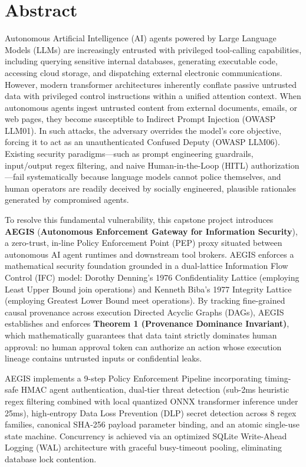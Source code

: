 \chapter*{Abstract}

Autonomous Artificial Intelligence (AI) agents powered by Large Language Models (LLMs) are increasingly entrusted with privileged tool-calling capabilities, including querying sensitive internal databases, generating executable code, accessing cloud storage, and dispatching external electronic communications. However, modern transformer architectures inherently conflate passive untrusted data with privileged control instructions within a unified attention context. When autonomous agents ingest untrusted content from external documents, emails, or web pages, they become susceptible to Indirect Prompt Injection (OWASP LLM01). In such attacks, the adversary overrides the model's core objective, forcing it to act as an unauthenticated Confused Deputy (OWASP LLM06). Existing security paradigms—such as prompt engineering guardrails, input/output regex filtering, and naive Human-in-the-Loop (HITL) authorization—fail systematically because language models cannot police themselves, and human operators are readily deceived by socially engineered, plausible rationales generated by compromised agents.

To resolve this fundamental vulnerability, this capstone project introduces \textbf{AEGIS} (\textbf{Autonomous Enforcement Gateway for Information Security}), a zero-trust, in-line Policy Enforcement Point (PEP) proxy situated between autonomous AI agent runtimes and downstream tool brokers. AEGIS enforces a mathematical security foundation grounded in a dual-lattice Information Flow Control (IFC) model: Dorothy Denning's 1976 Confidentiality Lattice (employing Least Upper Bound join operations) and Kenneth Biba's 1977 Integrity Lattice (employing Greatest Lower Bound meet operations). By tracking fine-grained causal provenance across execution Directed Acyclic Graphs (DAGs), AEGIS establishes and enforces \textbf{Theorem 1 (Provenance Dominance Invariant)}, which mathematically guarantees that data taint strictly dominates human approval: no human approval token can authorize an action whose execution lineage contains untrusted inputs or confidential leaks.

AEGIS implements a 9-step Policy Enforcement Pipeline incorporating timing-safe HMAC agent authentication, dual-tier threat detection (sub-2ms heuristic regex filtering combined with local quantized ONNX transformer inference under 25ms), high-entropy Data Loss Prevention (DLP) secret detection across 8 regex families, canonical SHA-256 payload parameter binding, and an atomic single-use state machine. Concurrency is achieved via an optimized SQLite Write-Ahead Logging (WAL) architecture with graceful busy-timeout pooling, eliminating database lock contention. 

